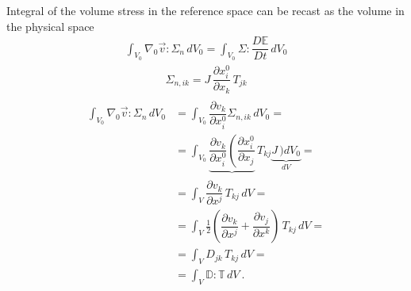 \documentclass[letterpaper,10pt,english]{jupyterBook}
\begin{document}
\sphinxAtStartPar
Integral of the volume stress in the reference space can be recast as the volume in the physical space
\begin{equation*}
\begin{split}\int_{V_0} \nabla_0 \vec{v} : \mathbb{\Sigma}_n \, dV_0 = \int_{V_0} \mathbb{\Sigma} : \dfrac{D \mathbb{E}}{D t} \, d V_0 \end{split}
\end{equation*}\begin{equation*}
\begin{split}\Sigma_{n, ik} = J \, \dfrac{\partial x^0_i}{\partial x_k} \, T_{jk}\end{split}
\end{equation*}\begin{equation*}
\begin{split}\begin{aligned}
  \int_{V_0} \nabla_0 \vec{v} : \mathbb{\Sigma}_n \, dV_0 
  & =  \int_{V_0} \dfrac{\partial v_k}{\partial x^0_i} \Sigma_{n, ik} \, dV_0 = \\
  & =  \int_{V_0} \underbrace{\dfrac{\partial v_k}{\partial x^0_i} \left( \dfrac{\partial x^0_i}{\partial x_j} \right.}_{}  \, T_{kj}  \underbrace{J\, \bigg) dV_0}_{d V} = \\
  & =  \int_{V} \dfrac{\partial v_k}{\partial x^j} \, T_{kj} \, d V = \\
  & =  \int_{V} \frac{1}{2} \left( \dfrac{\partial v_k}{\partial x^j} + \dfrac{\partial v_j}{\partial x^k} \right) \, T_{kj} \, d V = \\
  & =  \int_{V} D_{jk} \, T_{kj} \, d V = \\
  & =  \int_{V} \mathbb{D} : \mathbb{T} \, d V  \ .
\end{aligned}\end{split}
\end{equation*}
\end{document}
